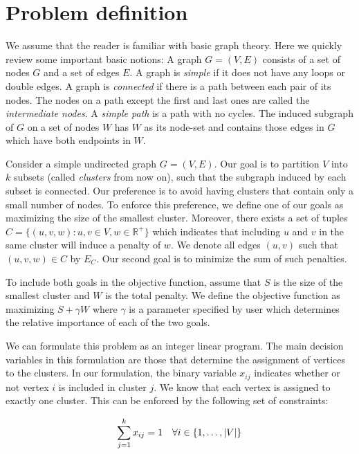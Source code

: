 \documentclass[conference,compsoc]{IEEEtran}
\begin{document}
\section{Problem definition}
\label{sec:definition}

We assume that the reader is familiar with basic graph theory. Here we quickly review some important basic notions: A graph $G=(V, E)$ consists of a set of nodes $G$ and a set of edges $E$. A graph is \emph{simple} if it does not have any loops or double edges. A graph is \emph{connected} if there is a path between each pair of its nodes. The nodes on a path except the first and last ones are called the \emph{intermediate nodes}. A \emph{simple path} is a path with no cycles. The induced subgraph of $G$ on a set of nodes $W$ has $W$ as its node-set and contains those edges in $G$ which have both endpoints in $W$. 

Consider a simple undirected graph $G=(V, E)$. Our goal is to partition $V$
into $k$ subsets (called \emph{clusters} from now on), such that the
subgraph induced by each subset is connected. Our preference is to avoid
having clusters that contain only a small number of nodes. To enforce
this preference, we define one of our goals as maximizing the size of
the smallest cluster. Moreover, there exists a set of tuples
$C = \{(u, v, w): u, v \in V, w \in \mathbb{R}^+\}$ which indicates that
including $u$ and $v$ in the same cluster will induce a penalty of $w$. We denote all edges $(u, v)$ such that $(u, v, w) \in C$ by $E_C$. Our second goal is to minimize the sum of such penalties.

To include both goals in the objective function, assume that $S$ is the
size of the smallest cluster and $W$ is the total penalty. We define the
objective function as maximizing $S + \gamma W$ where $\gamma$ is a
parameter specified by user which determines the relative importance of
each of the two goals.

We can formulate this problem as an integer linear program. The main
decision variables in this formulation are those that determine the
assignment of vertices to the clusters. In our formulation, the binary
variable $x_{ij}$ indicates whether or not vertex $i$ is included in
cluster $j$. We know that each vertex is assigned to exactly one
cluster. This can be enforced by the following set of constraints:

\begin{equation}
\sum_{j=1}^k x_{ij} = 1 \quad \forall i \in \{1, \ldots, |V|\} \label{cons:assign}\\
\end{equation}
\end{document}
